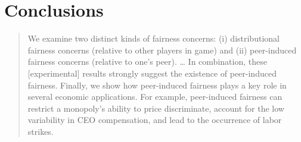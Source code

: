 \documentclass[../root]{subfiles}
\begin{document}
    \hypertarget{conclusions}{%
    \section{Conclusions}\label{conclusions}}

    \begin{quote}
    We examine two distinct kinds of fairness concerns: (i) distributional fairness concerns (relative to other players in game) and (ii) peer-induced fairness concerns (relative to one's peer). \ldots{} In combination, these {[}experimental{]} results strongly suggest the existence of peer-induced fairness. Finally, we show how peer-induced fairness plays a key role in several economic applications. For example, peer-induced fairness can restrict a monopoly's ability to price discriminate, account for the low variability in CEO compensation, and lead to the occurrence of labor strikes.
    \end{quote}

    \biblio
\end{document}
